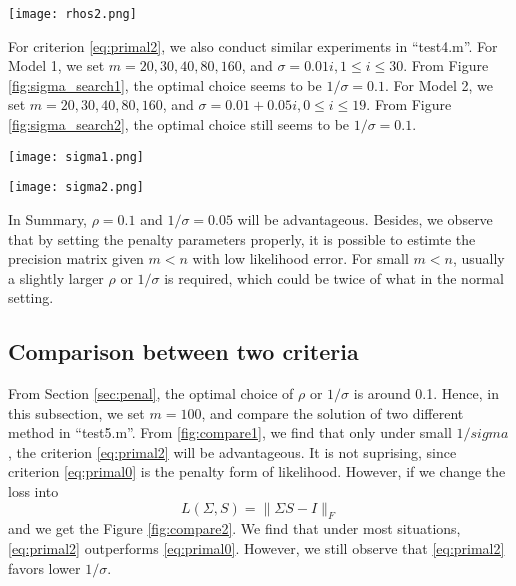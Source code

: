 \documentclass[conference,onecolumn,12pt]{IEEEtran}
\newcommand{\<}{\langle}
\renewcommand{\>}{\rangle}
\numberwithin{equation}{section}
\begin{document}
\begin{figure*}
    \centering
    \texttt{[image: rhos2.png]}
    \caption{Search for $\rho$ in range $[0.01,0.1]$ based on Model 2}
    \label{fig:rho_search2}
\end{figure*}


For criterion \ref{eq:primal2}, we also conduct similar experiments in ``test4.m''. For Model 1, we set $m=20,30,40,80,160$, and $\sigma=0.01i,1\leq i\leq 30$. From Figure \ref{fig:sigma_search1}, the optimal choice seems to be $1/\sigma=0.1$. For Model 2, we set $m=20,30,40,80,160$, and $\sigma=0.01+0.05i,0\leq i\leq 19$. From Figure \ref{fig:sigma_search2}, the optimal choice still seems to be $1/\sigma=0.1$.
\begin{figure*}[!htbp]
    \centering
    \texttt{[image: sigma1.png]}
    \caption{Search for $1/\sigma$ based on Model 1}
    \label{fig:sigma_search1}
\end{figure*}
\begin{figure*}[!htbp]
    \centering
    \texttt{[image: sigma2.png]}
    \caption{Search for $1/\sigma$ in range based on Model 2}
    \label{fig:sigma_search2}
\end{figure*}

In Summary, $\rho=0.1$ and $1/\sigma=0.05$ will be advantageous. Besides, we observe that by setting the penalty parameters properly, it is possible to estimte the precision matrix given $m<n$ with low likelihood error. For small $m<n$, usually a slightly larger $\rho$ or $1/\sigma$ is required, which could be twice of what in the normal setting.

\subsection{Comparison between two criteria}
From Section \ref{sec:penal}, the optimal choice of $\rho$ or $1/ \sigma $ is around 0.1. Hence, in this subsection, we set $m=100$, and compare the solution of two different method in ``test5.m''. From \ref{fig:compare1}, we find that only under small $1/sigma$, the criterion \ref{eq:primal2} will be advantageous. It is not suprising, since criterion \ref{eq:primal0} is the penalty form of likelihood. However, if we change the loss into
\begin{equation}
    L(\Sigma,S)=\|\Sigma S-I\|_F
\end{equation}
and we get the Figure \ref{fig:compare2}. We find that under most situations, \ref{eq:primal2} outperforms \ref{eq:primal0}. However, we still observe that \ref{eq:primal2} favors lower $1/\sigma$. 
\end{document}
